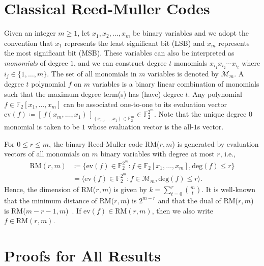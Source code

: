\documentclass[twoside,romanappendices]{IEEEtran}
\begin{document}
\section{Classical Reed-Muller Codes}
\label{sec:rm_codes}


Given an integer $m \geq 1$, let $x_1, x_2, \ldots, x_m$ be binary variables and we adopt the convention that $x_1$ represents the least significant bit (LSB) and $x_m$ represents the most significant bit (MSB).
These variables can also be interpreted as \emph{monomials} of degree $1$, and we can construct degree $t$ monomials $x_{i_1} x_{i_2} \cdots x_{i_t}$ where $i_j \in \{ 1,\ldots,m \}$.
The set of all monomials in $m$ variables is denoted by $\mathcal{M}_m$.
A degree $t$ polynomial $f$ on $m$ variables is a binary linear combination of monomials such that the maximum degree term(s) has (have) degree $t$.
Any polynomial $f \in \mathbb{F}_2[x_1,\ldots,x_m]$ can be associated one-to-one to its evaluation vector $\text{ev}(f) \coloneqq [\, f(x_m,\ldots,x_1)\, ]_{(x_m,\ldots,x_1) \in \mathbb{F}_2^m} \in \mathbb{F}_2^{2^m}$.
Note that the unique degree $0$ monomial is taken to be $1$ whose evaluation vector is the all-$1$s vector. 

For $0 \leq r \leq m$, the binary Reed-Muller code RM($r,m$) is generated by evaluation vectors of all monomials on $m$ binary variables with degree at most $r$, i.e.,
\begin{align}
\text{RM}(r,m) & \coloneqq \{ \text{ev}(f) \in \mathbb{F}_2^{2^m} \colon f \in \mathbb{F}_2[x_1,\ldots,x_m], \text{deg}(f) \leq r \} \nonumber \\
%
  & = \langle \text{ev}(f) \in \mathbb{F}_2^{2^m} \colon f \in \mathcal{M}_m, \text{deg}(f) \leq r \rangle.
\end{align}
Hence, the dimension of RM($r,m$) is given by $k = \sum_{t=0}^{r} \binom{m}{t}$.
It is well-known that the minimum distance of RM($r,m$) is $2^{m-r}$ and that the dual of RM($r,m$) is RM($m-r-1,m$)~\cite{Macwilliams-1977}.
If $\text{ev}(f) \in \text{RM}(r,m)$, then we also write $f \in \text{RM}(r,m)$.



\section{Proofs for All Results}
\label{sec:all_proofs}
\end{document}
